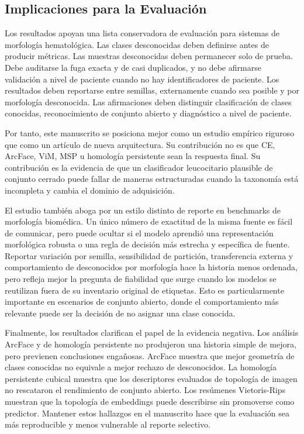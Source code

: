 \documentclass[11pt]{article}
\begin{document}
\subsection{Implicaciones para la Evaluación}

Los resultados apoyan una lista conservadora de evaluación para sistemas de morfología hematológica. Las clases desconocidas deben definirse antes de producir métricas. Las muestras desconocidas deben permanecer solo de prueba. Debe auditarse la fuga exacta y de casi duplicados, y no debe afirmarse validación a nivel de paciente cuando no hay identificadores de paciente. Los resultados deben reportarse entre semillas, externamente cuando sea posible y por morfología desconocida. Las afirmaciones deben distinguir clasificación de clases conocidas, reconocimiento de conjunto abierto y diagnóstico a nivel de paciente.

Por tanto, este manuscrito se posiciona mejor como un estudio empírico riguroso que como un artículo de nueva arquitectura. Su contribución no es que CE, ArcFace, ViM, MSP u homología persistente sean la respuesta final. Su contribución es la evidencia de que un clasificador leucocitario plausible de conjunto cerrado puede fallar de maneras estructuradas cuando la taxonomía está incompleta y cambia el dominio de adquisición.

El estudio también aboga por un estilo distinto de reporte en benchmarks de morfología biomédica. Un único número de exactitud de la misma fuente es fácil de comunicar, pero puede ocultar si el modelo aprendió una representación morfológica robusta o una regla de decisión más estrecha y específica de fuente. Reportar variación por semilla, sensibilidad de partición, transferencia externa y comportamiento de desconocidos por morfología hace la historia menos ordenada, pero refleja mejor la pregunta de fiabilidad que surge cuando los modelos se reutilizan fuera de su inventario original de etiquetas. Esto es particularmente importante en escenarios de conjunto abierto, donde el comportamiento más relevante puede ser la decisión de no asignar una clase conocida.

Finalmente, los resultados clarifican el papel de la evidencia negativa. Los análisis ArcFace y de homología persistente no produjeron una historia simple de mejora, pero previenen conclusiones engañosas. ArcFace muestra que mejor geometría de clases conocidas no equivale a mejor rechazo de desconocidos. La homología persistente cubical muestra que los descriptores evaluados de topología de imagen no rescataron el rendimiento de conjunto abierto. Los resúmenes Vietoris-Rips muestran que la topología de embeddings puede describirse sin promoverse como predictor. Mantener estos hallazgos en el manuscrito hace que la evaluación sea más reproducible y menos vulnerable al reporte selectivo.
\end{document}
